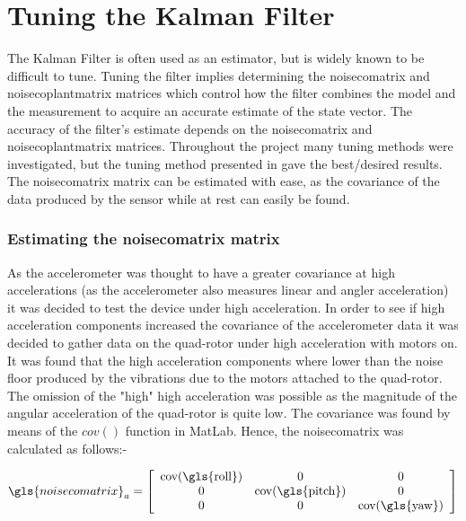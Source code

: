\section{Tuning the Kalman Filter}
The Kalman Filter is often used as an estimator, but is widely known to be difficult to tune. Tuning the filter implies determining the \gls{noisecomatrix} and \gls{noisecoplantmatrix} matrices which control how the filter combines the model and the measurement to acquire an accurate estimate of the state vector. The accuracy of the filter's estimate depends on the \gls{noisecomatrix} and \gls{noisecoplantmatrix} matrices. Throughout the project many tuning methods were investigated, but the tuning method presented in \cite{gordon_paper} gave the best/desired results. The \gls{noisecomatrix} matrix can be estimated with ease, as the covariance of the data produced by the sensor while at rest can easily be found.

\subsubsection{Estimating the \gls{noisecomatrix} matrix}
As the accelerometer was thought to have a greater covariance at high accelerations (as the accelerometer also measures linear and angler acceleration) it was decided to test the device under high acceleration. In order to see if high acceleration components increased the covariance of the accelerometer data it was decided to gather data on the quad-rotor under high acceleration with motors on. It was found that the high acceleration components where lower than the noise floor produced by the vibrations due to the motors attached to the quad-rotor. The omission of the "high" high acceleration was possible as the magnitude of the angular acceleration of the quad-rotor is quite low. The covariance was found by means of the $cov()$ function in MatLab. Hence, the \gls{noisecomatrix} was calculated as follows:-

					\begin{equation}
					\gls{noisecomatrix}_a  = 		
					\left[\begin{array}{ccc}
					\mathrm{cov(\gls{roll})}       &                 0                          & 0\\ 
					0       & \mathrm{cov(\gls{pitch})}           & 0\\
					0         &                0                          &\mathrm{cov(\gls{yaw})}
					\end{array} \right]
					\end{equation}


